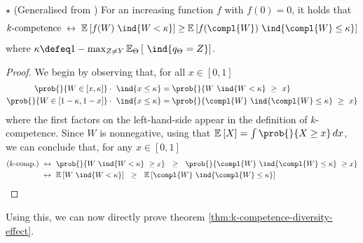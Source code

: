 \documentclass[../main.tex]{subfiles}
\begin{document}
\begin{lemma} $\star$ (Generalised from \cite{theisen_WhenAreEnsembles_2023}) \label{thm:lemma-2} For an increasing function $f$ with $f(0)=0$, it holds that
$$
\text{$k$-competence}  ~\leftrightarrow~ \mathbb{E}_{}\left[ f(W) ~\ind{W < \kappa} \right] \geq \mathbb{E}_{}\left[ f(\compl{W}) ~\ind{\compl{W} \leq \kappa } \right]  
$$
where $ \kappa \defeq 1 - \max_{Z \not= Y} \mathbb{E}_{\Theta}\left[ ~\ind{q_{\Theta} = Z} \right]$.
\end{lemma}
\begin{proof}

We begin by observing that, for all $x \in [0,1]$
\begin{align*}
\prob{}{W \in [x, \kappa] } \cdot ~\ind{x \leq \kappa } &= \prob{}{W ~\ind{W < \kappa} ~ \geq ~ x} \\
\prob{}{W \in [1-\kappa,1-x]} \cdot ~\ind{x \leq \kappa} &= \prob{}{\compl{W} ~\ind{\compl{W} \leq \kappa } ~ \geq ~ x }
\end{align*}
where the first factors on the left-hand-side appear in the definition of $k$-competence.
Since $W$ is nonnegative, using that $\mathbb{E}_{}\left[ X \right] = \int \prob{}{X \geq x} \, dx$, we can conclude that, for any $x \in [0,1]$
\begin{align*}
\text{($k$-comp.)}  &~\leftrightarrow~  
\prob{}{W ~\ind{W < \kappa} ~ \geq x} 
~ ~ \geq ~ ~
\prob{}{\compl{W} ~\ind{\compl{W} \leq \kappa } ~ \geq x } \\
& ~\leftrightarrow~
\mathbb{E}_{}\left[ W ~\ind{W < \kappa} \right] ~ ~ \geq ~ ~ \mathbb{E}_{}\left[ \compl{W} ~\ind{\compl{W} \leq \kappa }  \right] 
\end{align*}
\end{proof}
Using this, we can now directly prove theorem \ref{thm:k-competence-diversity-effect}.
\end{document}
